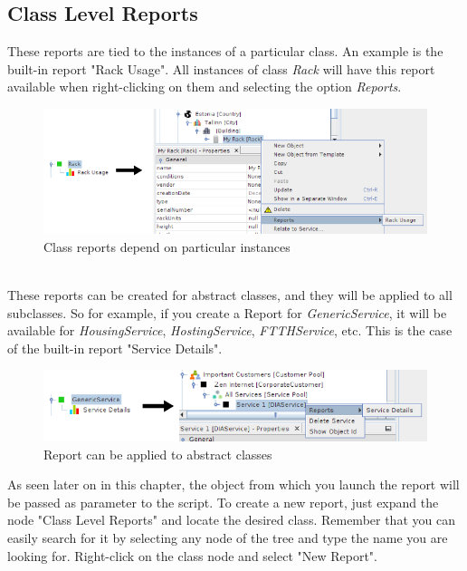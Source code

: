 \documentclass[a4paper]{article}
\begin{document}
		\subsection{Class Level Reports}
			 These reports are tied to the instances of a particular class. An example is the built-in report "Rack Usage". All instances of class \textit{Rack} will have this report available when right-clicking on them and selecting the option \textit{Reports}.
			\begin{figure}[h!]
				\centering
				\includegraphics[scale=0.7]{img/reports_rack_report.png}
				\caption{Class reports depend on particular instances}
				\label{fig:reports_rack_report}
			\end{figure}\\
			These reports can be created for abstract classes, and they will be applied to all subclasses. So for example, if you create a Report for \textit{GenericService}, it will be available for \textit{HousingService}, \textit{HostingService}, \textit{FTTHService}, etc. This is the case of the built-in report "Service Details".\\
			\newpage
			\begin{figure}[h!]
				\centering
				\includegraphics[scale=0.8]{img/reports_abstract_class_report.png}
				\caption{Report can be applied to abstract classes}
				\label{fig:reports_abstract_class_report}
			\end{figure}
			As seen later on in this chapter, the object from which you launch the report will be passed as parameter to the script. To create a new report, just expand the node "Class Level Reports" and locate the desired class. Remember that you can easily search for it by selecting any node of the tree and type the name you are looking for. Right-click on the class node and select "New Report".
\end{document}
